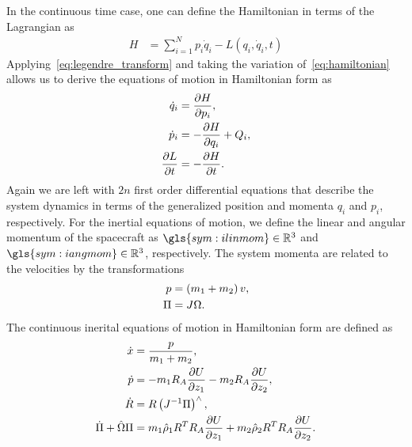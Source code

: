 In the continuous time case, one can define the Hamiltonian in terms of the Lagrangian as
\begin{align}\label{eq:hamiltonian}
	H &= \sum_{i = 1}^N p_i \dot{q}_i - L \left( q_i,\dot{q}_i, t \right)
\end{align}
Applying~\cref{eq:legendre_transform} and taking the variation of~\cref{eq:hamiltonian} allows us to derive the equations of motion in Hamiltonian form as
\begin{align}\label{eq:hamilton_eq}
	\dot{q}_i &= \frac{\partial H}{\partial p_i}, \\
	\dot{p}_i &= - \frac{\partial H}{\partial q_i} + Q_i, \\
	\frac{\partial L}{\partial t} &= -\frac{\partial H}{\partial t}.
\end{align}
Again we are left with \( 2n \) first order differential equations that describe the system dynamics in terms of the generalized position and momenta \( q_i \) and \( p_i\), respectively.
For the inertial equations of motion, we define the linear and angular momentum of the spacecraft as \( \gls{sym:ilinmom} \in \R^3\) and \( \gls{sym:iangmom} \in \R^3 \), respectively.
The system momenta are related to the velocities by the transformations
\begin{align}
    p &= \left( m_1 + m_2 \right) v , \\
    \Pi & = J \Omega.
\end{align}
The continuous inerital equations of motion in Hamiltonian form are defined as
\begin{align}
    \dot {x} &= \frac{p}{m_1 + m_2}, \label{eq:inertial_position_dynamics_hamiltonian}\\
    \dot {p} &= - m_1 R_A \frac{\partial U}{\partial z_1} - m_2 R_A \frac{\partial U}{\partial z_2}, \label{eq:inertial_velocity_dynamics_hamiltonian}\\
    \dot {R} &= R \left( J^{-1} \Pi \right)^\wedge, \label{eq:inertial_attitude_dynamics_hamiltonian}\\
    \dot{\Pi}  + \hat{\Omega} \Pi &= m_1 \hat{\rho}_1 R^T R_A \frac{\partial U}{\partial z_1} + m_2 \hat{\rho}_2 R^T R_A \frac{\partial U}{\partial z_2}. \label{eq:inertial_angvel_dynamics_hamiltonian}
\end{align}

